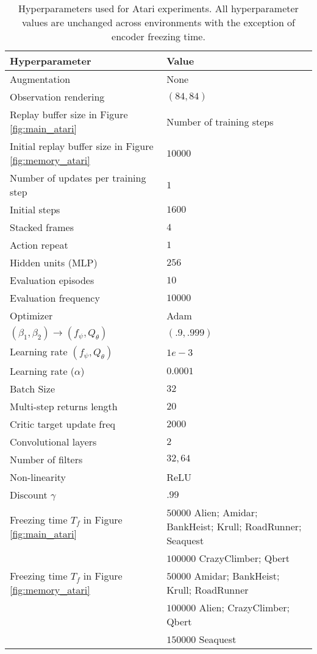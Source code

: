 \documentclass{article}
\begin{document}
\begin{table*}[ht]
\caption{Hyperparameters used for Atari experiments. All hyperparameter values are unchanged across environments with the exception of encoder freezing time.}
\vskip 0.15in
\begin{center}
\begin{small}
\begin{tabular}{ll}
\toprule
\textbf{Hyperparameter} & \textbf{Value}  \\
\midrule
Augmentation    & None  \\ 
Observation rendering    & $(84,84)$  \\ 
Replay buffer size in Figure \ref{fig:main_atari}   & Number of training steps \\ 
Initial replay buffer size in Figure \ref{fig:memory_atari}  & $10000$ \\
Number of updates per training step  & $1$ \\
Initial steps    & $1600$  \\ 
Stacked frames    & $4$  \\ 
Action repeat    & $1$ \\
Hidden units (MLP)    & $256$  \\ 
Evaluation episodes    & $10$  \\ 
Evaluation frequency    & $10000$  \\ 
Optimizer    & Adam  \\ 
$(\beta_1,\beta_2) \rightarrow (f_\psi, Q_\theta)$   & $(.9,.999)$  \\
Learning rate $(f_\psi, Q_\theta)$ 
& $1e-3$ \\ 
Learning rate ($\alpha$) & $0.0001$ \\
Batch Size    & $32$   \\ 
Multi-step returns length & $20$ \\
Critic target update freq & $2000$ \\
Convolutional layers & $2$ \\
Number of filters & $32, 64$ \\
Non-linearity & ReLU \\
Discount $\gamma$ & $.99$ \\
Freezing time $T_f$ in Figure \ref{fig:main_atari} 
 & $50000$ Alien; Amidar; BankHeist; Krull; RoadRunner; Seaquest \\
 & $100000$ CrazyClimber; Qbert \\
Freezing time $T_f$ in Figure \ref{fig:memory_atari} 
 & $50000$ Amidar; BankHeist; Krull; RoadRunner \\
 & $100000$ Alien; CrazyClimber; Qbert \\
 & $150000$ Seaquest  \\
\bottomrule
\end{tabular}
\end{small}
\label{tbl:atari_hyperparameters}
\end{center}
\vskip -0.1in
\end{table*} 
\end{document}
